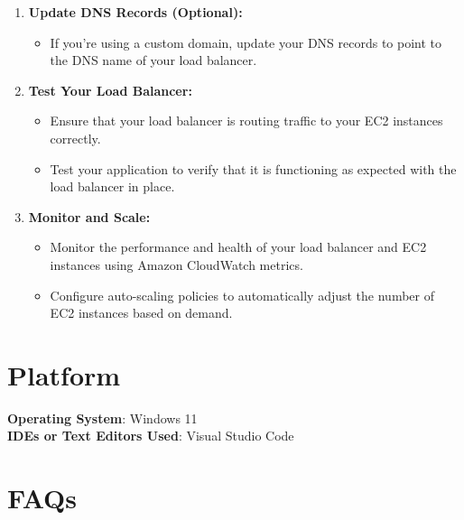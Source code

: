 \documentclass[11pt]{article}
\begin{document}
\begin{enumerate}
    \item \textbf{Update DNS Records (Optional):}
          \begin{itemize}
              \item If you're using a custom domain, update your DNS records to point to the DNS name of your load balancer.
          \end{itemize}

    \item \textbf{Test Your Load Balancer:}
          \begin{itemize}
              \item Ensure that your load balancer is routing traffic to your EC2 instances correctly.
              \item Test your application to verify that it is functioning as expected with the load balancer in place.
          \end{itemize}

    \item \textbf{Monitor and Scale:}
          \begin{itemize}
              \item Monitor the performance and health of your load balancer and EC2 instances using Amazon CloudWatch metrics.
              \item Configure auto-scaling policies to automatically adjust the number of EC2 instances based on demand.
          \end{itemize}
\end{enumerate}

\section{Platform}
\textbf{Operating System}: Windows 11 \\
\textbf{IDEs or Text Editors Used}: Visual Studio Code\\

% 

\section{FAQs}
\end{document}
